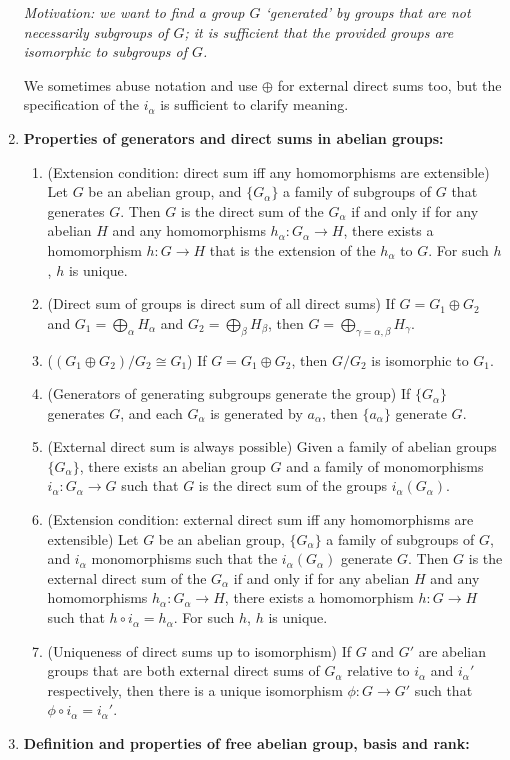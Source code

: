 \documentclass[letterpaper, 12pt]{article}
\begin{document}
\begin{enumerate}[resume]
{            \textit{Motivation: we want to find a group $G$ `generated' by groups that are not necessarily subgroups of $G$; it is sufficient that the provided groups are isomorphic to subgroups of $G$.}

            We sometimes abuse notation and use $\oplus$ for external direct sums too, but the specification of the $i_\alpha$ is sufficient to clarify meaning.}
            \item \textbf{Properties of generators and direct sums in abelian groups:}
                \begin{enumerate}
                \item (Extension condition: direct sum iff any homomorphisms are extensible) Let $G$ be an abelian group, and $\{G_\alpha\}$ a family of subgroups of $G$ that generates $G$. Then $G$ is the direct sum of the $G_\alpha$ if and only if for any abelian $H$ and any homomorphisms $h_\alpha : G_\alpha \to H$, there exists a homomorphism $h: G\to H$ that is the extension of the $h_\alpha$ to $G$. For such $h$, $h$ is unique.
                \item (Direct sum of groups is direct sum of all direct sums) If $G = G_1 \oplus G_2$ and $G_1 = \bigoplus_\alpha H_\alpha$ and $G_2 = \bigoplus_\beta H_\beta$, then $G = \bigoplus_{\gamma = \alpha, \beta} H_\gamma$.
                \item ($(G_1\oplus G_2)/G_2 \cong G_1$) If $G = G_1\oplus G_2$, then $G/G_2$ is isomorphic to $G_1$.
                \item (Generators of generating subgroups generate the group) If $\{G_\alpha\}$ generates $G$, and each $G_\alpha$ is generated by $a_\alpha$, then $\{a_\alpha\}$ generate $G$.
                \item (External direct sum is always possible) Given a family of abelian groups $\{G_\alpha\}$, there exists an abelian group $G$ and a family of monomorphisms $i_\alpha : G_\alpha \to G$ such that $G$ is the direct sum of the groups $i_\alpha(G_\alpha)$.
                \item (Extension condition: external direct sum iff any homomorphisms are extensible) Let $G$ be an abelian group, $\{G_\alpha\}$ a family of subgroups of $G$, and $i_\alpha$ monomorphisms such that the $i_\alpha(G_\alpha)$ generate $G$. Then $G$ is the external direct sum of the $G_\alpha$ if and only if for any abelian $H$ and any homomorphisms $h_\alpha : G_\alpha \to H$, there exists a homomorphism $h: G\to H$ such that $h\circ i_\alpha = h_\alpha$. For such $h$, $h$ is unique.
                \item (Uniqueness of direct sums up to isomorphism) If $G$ and $G'$ are abelian groups that are both external direct sums of $G_\alpha$ relative to $i_\alpha$ and $i_\alpha'$ respectively, then there is a unique isomorphism $\phi : G\to G'$ such that $\phi\circ i_\alpha = i_\alpha'$.
                \end{enumerate}
        \item \textbf{Definition and properties of free abelian group, basis and rank:}
            

\end{enumerate}
\end{document}
